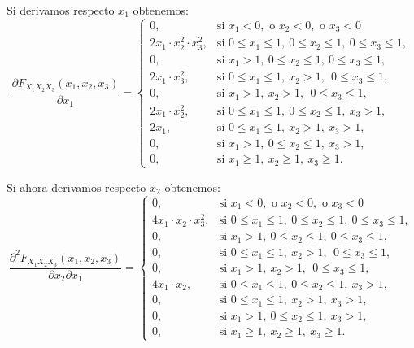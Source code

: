 \documentclass[
  letterpaper,
  DIV=11,
  numbers=noendperiod]{scrreprt}
\begin{document}
Si derivamos respecto \(x_1\) obtenemos: \[
\frac{\partial F_{X_1X_2X_3}(x_1,x_2,x_3)}{\partial x_1}=\begin{cases}
0, & \mbox{si }x_1<0,\mbox{ o }x_2<0,\mbox{ o }x_3 <0\\
2 x_1\cdot x_2^2\cdot x_3^2, & \mbox{si }0\leq x_1\leq 1,\ 0\leq x_2\leq 1,\ 0\leq x_3\leq 1, \\
 0, & \mbox{si }x_1> 1,\ 0\leq x_2\leq  1,\ 0\leq x_3\leq  1, \\
 2 x_1 \cdot x_3^2, & \mbox{si }0\leq x_1\leq  1,\ x_2> 1,\ \ 0\leq x_3\leq  1, \\
 0, & \mbox{si }x_1> 1,\ x_2> 1,\ \ 0\leq x_3\leq  1, \\
 2 x_1\cdot x_2^2, & \mbox{si }0\leq x_1\leq  1,\ 0\leq x_2\leq  1,\ x_3> 1,\\
 2 x_1, & \mbox{si }0\leq x_1\leq  1,\ x_2 >  1,\ x_3> 1,\\
 0, & \mbox{si }x_1>1,\ 0\leq x_2\leq  1,\ x_3> 1,\\
0, & \mbox{si }x_1\geq 1,\ x_2\geq 1,\ x_3\geq 1.
\end{cases}
\]

Si ahora derivamos respecto \(x_2\) obtenemos: \[
\frac{\partial^2 F_{X_1X_2X_3}(x_1,x_2,x_3)}{\partial x_2\partial x_1}=\begin{cases}
0, & \mbox{si }x_1<0,\mbox{ o }x_2<0,\mbox{ o }x_3 <0\\
4 x_1\cdot x_2\cdot x_3^2, & \mbox{si }0\leq x_1\leq 1,\ 0\leq x_2\leq 1,\ 0\leq x_3\leq 1, \\
 0, & \mbox{si }x_1> 1,\ 0\leq x_2\leq  1,\ 0\leq x_3\leq  1, \\
 0, & \mbox{si }0\leq x_1\leq  1,\ x_2> 1,\ \ 0\leq x_3\leq  1, \\
 0, & \mbox{si }x_1> 1,\ x_2> 1,\ \ 0\leq x_3\leq  1, \\
 4 x_1\cdot x_2, & \mbox{si }0\leq x_1\leq  1,\ 0\leq x_2\leq  1,\ x_3> 1,\\
 0, & \mbox{si }0\leq x_1\leq  1,\ x_2 >  1,\ x_3> 1,\\
 0, & \mbox{si }x_1>1,\ 0\leq x_2\leq  1,\ x_3> 1,\\
0, & \mbox{si }x_1\geq 1,\ x_2\geq 1,\ x_3\geq 1.
\end{cases}
\]
\end{document}
